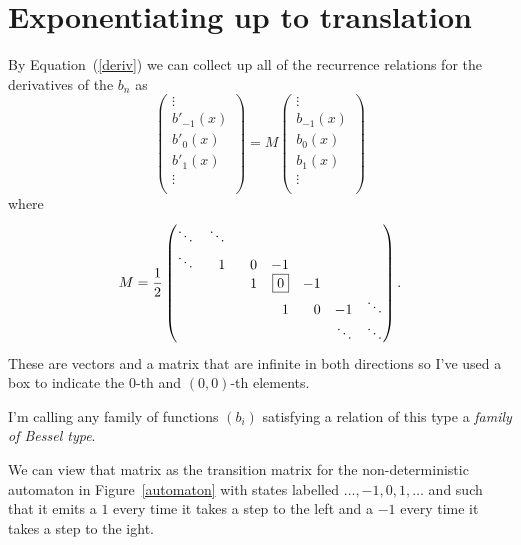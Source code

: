 \documentclass{article}
\begin{document}
\section{Exponentiating up to translation}
By Equation~(\ref{deriv}) we can collect up all of the recurrence relations for the derivatives of the $b_n$ as
\[
\begin{pmatrix}
\vdots \\
b'_{-1}(x) \\
\boxed{b'_0(x)} \\
b'_1(x) \\
\vdots \\
\end{pmatrix}
=
M
\begin{pmatrix}
\vdots \\
b_{-1}(x) \\
\boxed{b_0(x)} \\
b_1(x) \\
\vdots \\
\end{pmatrix}
\]
where
\[
M=\frac{1}{2}
\begin{pmatrix*}[r]
\ddots & \ddots &   &    &   &   &        \\
\ddots & \hphantom{-{}}1 & 0 & -1 &   &   &        \\
       &   & \phantom{-{}}1 & \boxed{0} & -1 &   &        \\
       &   &   & 1 & 0 & -1 & \ddots \\
       &   &   &   &   & \ddots & \ddots \\
\end{pmatrix*}.
\]
These are vectors and a matrix that are infinite in both directions so I've used a box to indicate the $0$-th and $(0,0)$-th elements.

I'm calling any family of functions $(b_i)$ satisfying a relation of this type a \textit{family of Bessel type}.

We can view that matrix as the transition matrix for the non-deterministic automaton in Figure~\ref{automaton} with states labelled $\ldots, -1, 0, 1, \ldots$ and such that it emits a $1$ every time it takes a step to the left and a $-1$ every time it takes a step to the ight.
\end{document}
